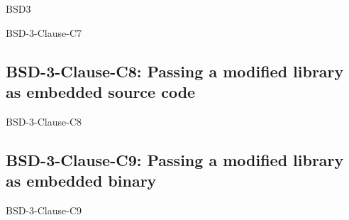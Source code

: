 \begin{license}{BSD3}
\begin{lsuc}{BSD-3-Clause-C7}
  \lsucmeans{\useCaseSeven}
  \lsuccovers{\coversSeven}

  \begin{lsucrequires}
    \lsucmandatory{\insertLicenseIntoBinary}\passingFilesCorrectly
  \end{lsucrequires}

  \begin{lsucprohibits}
    \lsucitem{\dontUseAuthorNames}%
  \end{lsucprohibits}
\end{lsuc}

\subsection{BSD-3-Clause-C8: Passing a modified library as embedded source code}
\begin{lsuc}{BSD-3-Clause-C8}

  \lsucmeans{\useCaseEight}
  \lsuccovers{\coversEight}

  \begin{lsucrequires}
    \lsucmandatory{\keepLicenseElements}
    \lsucoptional{\addLibraryLicenseToCopyrightMessage}
    \lsucoptional{\keepSourcesSeparate}
  \end{lsucrequires}

  \begin{lsucprohibits}
    \lsucitem{\dontUseAuthorNames}%
  \end{lsucprohibits}
\end{lsuc}

\subsection{BSD-3-Clause-C9: Passing a modified library as embedded binary}
\begin{lsuc}{BSD-3-Clause-C9}

  \lsucmeans{\useCaseNine}
  \lsuccovers{\coversNine}

  \begin{lsucrequires}
    \lsucmandatory{\insertLicenseIntoBinary}\passingFilesCorrectly
    \lsucoptional{\addLibraryLicenseToCopyrightMessage}
    \lsucoptional{\keepBinariesSeparate}
  \end{lsucrequires}

  \begin{lsucprohibits}
    \lsucitem{\dontUseAuthorNames}%
  \end{lsucprohibits}
\end{lsuc}

\end{license}


